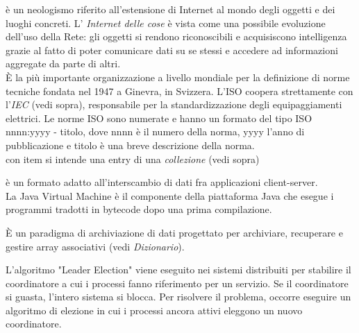 \documentclass{scalatekids-article}
\begin{document}
 è un neologismo riferito all'estensione di Internet al mondo degli oggetti e dei luoghi concreti.
L' \textit{Internet delle cose} è vista come una possibile evoluzione dell'uso della Rete: gli oggetti si rendono riconoscibili e acquisiscono intelligenza grazie al fatto di poter comunicare dati su se stessi e accedere ad informazioni aggregate da parte di altri.
\\

   È la più importante organizzazione a livello mondiale per la definizione di norme tecniche fondata nel 1947 a Ginevra, in Svizzera.
  L'ISO coopera strettamente con l'\textit{IEC} (vedi sopra), responsabile per la standardizzazione degli equipaggiamenti elettrici.
  Le norme ISO sono numerate e hanno un formato del tipo ISO nnnn:yyyy - titolo, dove nnnn è il numero della norma, yyyy l'anno di pubblicazione e titolo è una breve descrizione della norma.
  \\

   con item si intende una entry di una \textit{collezione} (vedi sopra)
  \\


   è un formato adatto all'interscambio di dati fra applicazioni client-server.
  \\

   La Java Virtual Machine è il componente della piattaforma Java che esegue i programmi tradotti in bytecode dopo una prima compilazione.
  \\


   È un paradigma di archiviazione di dati progettato per archiviare, recuperare e gestire array associativi (vedi \textit{Dizionario}).
  \\

  
 L'algoritmo "Leader Election" viene eseguito nei sistemi distribuiti per stabilire il coordinatore a cui i processi fanno riferimento per un servizio.
Se il coordinatore si guasta, l'intero sistema si blocca. Per risolvere il problema, occorre eseguire un algoritmo di elezione in cui i processi ancora attivi eleggono un nuovo coordinatore.
\\
\end{document}
